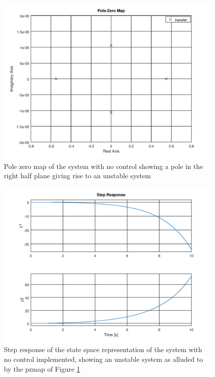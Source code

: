 \documentclass[a4paper, 12pt]{article}
\begin{document}
\begin{figure}[H]
  \centering
  \includegraphics[width=\textwidth]{images/pzmap.png}
  \caption{Pole zero map of the system with no control showing a pole in the right half plane giving rise to an unstable system}
  \label{fig:pzmap}
\end{figure}

\begin{figure}[H]
  \centering
  \includegraphics[width=\textwidth]{images/nocontrol.png}
  \caption{Step response of the state space representation of the system with no control implemented, showing an unstable system as alluded to by the pzmap of Figure \ref{fig:pzmap}}
  \label{fig:nocontrol}
\end{figure}
\end{document}
